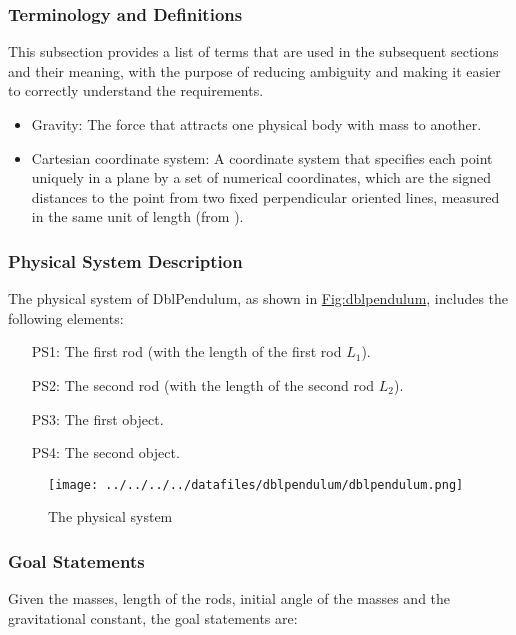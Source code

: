 \documentclass[12pt]{article}
\begin{document}
\subsubsection{Terminology and Definitions}
\label{Sec:TermDefs}
This subsection provides a list of terms that are used in the subsequent sections and their meaning, with the purpose of reducing ambiguity and making it easier to correctly understand the requirements.

\begin{itemize}
\item{Gravity: The force that attracts one physical body with mass to another.}
\item{Cartesian coordinate system: A coordinate system that specifies each point uniquely in a plane by a set of numerical coordinates, which are the signed distances to the point from two fixed perpendicular oriented lines, measured in the same unit of length (from \cite{cartesianWiki}).}
\end{itemize}
\subsubsection{Physical System Description}
\label{Sec:PhysSyst}
The physical system of DblPendulum, as shown in \hyperref[Figure:dblpendulum]{Fig:dblpendulum}, includes the following elements:

\begin{itemize}
\item[PS1:]{The first rod (with the length of the first rod ${L_{1}}$).}
\item[PS2:]{The second rod (with the length of the second rod ${L_{2}}$).}
\item[PS3:]{The first object.}
\item[PS4:]{The second object.}
\end{itemize}
\begin{figure}
\begin{center}
\texttt{[image: ../../../../datafiles/dblpendulum/dblpendulum.png]}
\caption{The physical system}
\label{Figure:dblpendulum}
\end{center}
\end{figure}
\subsubsection{Goal Statements}
\label{Sec:GoalStmt}
Given the masses, length of the rods, initial angle of the masses and the gravitational constant, the goal statements are:
\end{document}
